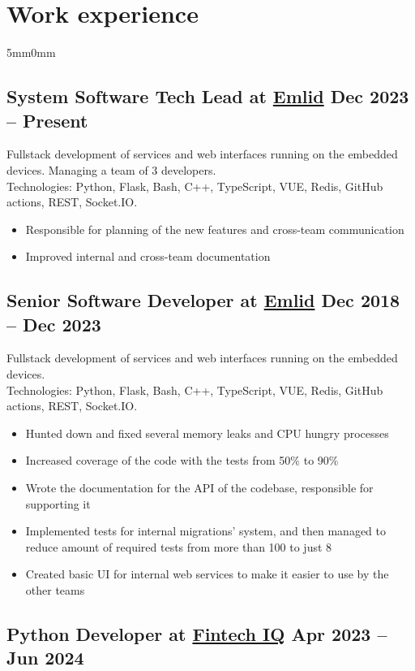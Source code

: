 \documentclass[10pt]{article}
\newcommand{\lmvalue}{5mm}
\newcommand{\rmvalue}{0mm}
\begin{document}
\section*{Work experience}
\begin{changemargin}{\lmvalue}{\rmvalue}
	\subsection*{System Software Tech Lead at \href{https://emlid.com}{Emlid}
		\hfill {\color{gray}Dec 2023 – Present}}
	Fullstack development of services and web interfaces running on the embedded devices.
	Managing a team of 3 developers.\\
	Technologies: Python, Flask, Bash, C++, TypeScript, VUE, Redis, GitHub actions, REST, Socket.IO\@.
	\begin{itemize}
		\item Responsible for planning of the new features and cross-team communication
		\item Improved internal and cross-team documentation
	\end{itemize}
	\subsection*{Senior Software Developer at \href{https://emlid.com}{Emlid}
		\hfill {\color{gray}Dec 2018 – Dec 2023}}
	Fullstack development of services and web interfaces running on the embedded devices.\\
	Technologies: Python, Flask, Bash, C++, TypeScript, VUE, Redis, GitHub actions, REST, Socket.IO\@.
	\begin{itemize}
		\item Hunted down and fixed several memory leaks and CPU hungry processes
		\item Increased coverage of the code with the tests from 50\% to 90\%
		\item Wrote the documentation for the API of the codebase, responsible for supporting it
		\item Implemented tests for internal migrations' system, and then managed to reduce amount of required tests from more than 100 to just 8
		\item Created basic UI for internal web services to make it easier to use by the other teams
	\end{itemize}

	\subsection*{Python Developer at \href{https://www.linkedin.com/company/fintech-iq/}{Fintech IQ}
		\hfill {\color{gray}Apr 2023 – Jun 2024}}


\end{changemargin}
\end{document}
